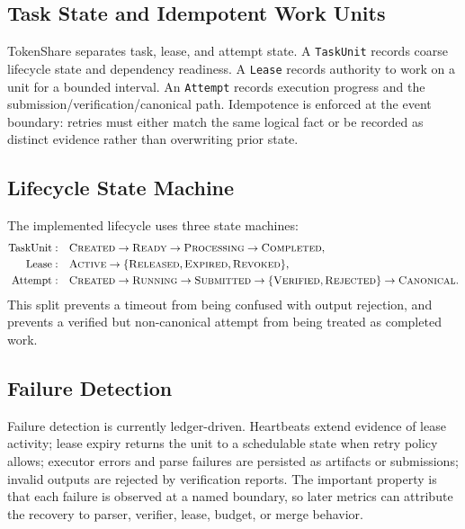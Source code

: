 \documentclass{article}
\theoremstyle{plain}
\begin{document}
\subsection{Task State and Idempotent Work Units}

{\color{blue}
TokenShare separates task, lease, and attempt state. A \texttt{TaskUnit} records coarse lifecycle state and dependency readiness. A \texttt{Lease} records authority to work on a unit for a bounded interval. An \texttt{Attempt} records execution progress and the submission/verification/canonical path. Idempotence is enforced at the event boundary: retries must either match the same logical fact or be recorded as distinct evidence rather than overwriting prior state.
}

\subsection{Lifecycle State Machine}

{\color{blue}
The implemented lifecycle uses three state machines:
\[
\begin{aligned}
\mathrm{TaskUnit}:&\quad
\textsc{Created}\rightarrow\textsc{Ready}\rightarrow\textsc{Processing}\rightarrow\textsc{Completed},\\
\mathrm{Lease}:&\quad
\textsc{Active}\rightarrow\{\textsc{Released},\textsc{Expired},\textsc{Revoked}\},\\
\mathrm{Attempt}:&\quad
\textsc{Created}\rightarrow\textsc{Running}\rightarrow\textsc{Submitted}\rightarrow
\{\textsc{Verified},\textsc{Rejected}\}\rightarrow\textsc{Canonical}.
\end{aligned}
\]
This split prevents a timeout from being confused with output rejection, and prevents a verified but non-canonical attempt from being treated as completed work.
}

\subsection{Failure Detection}

{\color{blue}
Failure detection is currently ledger-driven. Heartbeats extend evidence of lease activity; lease expiry returns the unit to a schedulable state when retry policy allows; executor errors and parse failures are persisted as artifacts or submissions; invalid outputs are rejected by verification reports. The important property is that each failure is observed at a named boundary, so later metrics can attribute the recovery to parser, verifier, lease, budget, or merge behavior.
}
\end{document}
